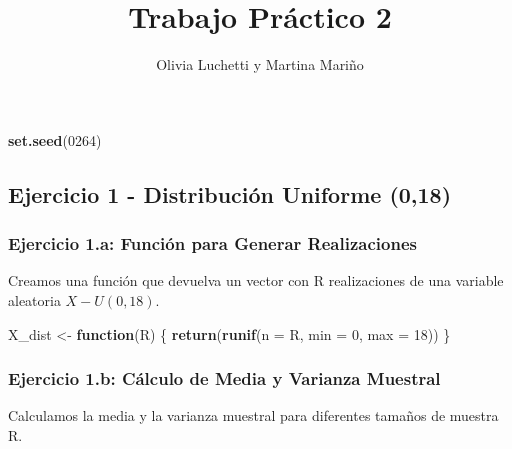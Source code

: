 \documentclass[
]{article}
\title{Trabajo Práctico 2}
\author{Olivia Luchetti y Martina Mariño}
\date{}
\newenvironment{Shaded}{\begin{snugshade}}{\end{snugshade}}
\newcommand{\AttributeTok}[1]{\textcolor[rgb]{0.13,0.29,0.53}{#1}}
\newcommand{\ControlFlowTok}[1]{\textcolor[rgb]{0.13,0.29,0.53}{\textbf{#1}}}
\newcommand{\DecValTok}[1]{\textcolor[rgb]{0.00,0.00,0.81}{#1}}
\newcommand{\FunctionTok}[1]{\textcolor[rgb]{0.13,0.29,0.53}{\textbf{#1}}}
\newcommand{\NormalTok}[1]{#1}
\newcommand{\OtherTok}[1]{\textcolor[rgb]{0.56,0.35,0.01}{#1}}
\begin{document}
\maketitle

\begin{Shaded}
\begin{Highlighting}[]
\FunctionTok{set.seed}\NormalTok{(}\DecValTok{0264}\NormalTok{)}
\end{Highlighting}
\end{Shaded}

\subsection{Ejercicio 1 - Distribución Uniforme
(0,18)}\label{ejercicio-1---distribuciuxf3n-uniforme-018}

\subsubsection{Ejercicio 1.a: Función para Generar
Realizaciones}\label{ejercicio-1.a-funciuxf3n-para-generar-realizaciones}

Creamos una función que devuelva un vector con R realizaciones de una
variable aleatoria \(X - U(0,18)\).

\begin{Shaded}
\begin{Highlighting}[]
\NormalTok{X\_dist }\OtherTok{\textless{}{-}} \ControlFlowTok{function}\NormalTok{(R) \{}
  \FunctionTok{return}\NormalTok{(}\FunctionTok{runif}\NormalTok{(}\AttributeTok{n =}\NormalTok{ R, }\AttributeTok{min =} \DecValTok{0}\NormalTok{, }\AttributeTok{max =} \DecValTok{18}\NormalTok{))}
\NormalTok{\}}
\end{Highlighting}
\end{Shaded}

\subsubsection{Ejercicio 1.b: Cálculo de Media y Varianza
Muestral}\label{ejercicio-1.b-cuxe1lculo-de-media-y-varianza-muestral}

Calculamos la media y la varianza muestral para diferentes tamaños de
muestra R.
\end{document}
